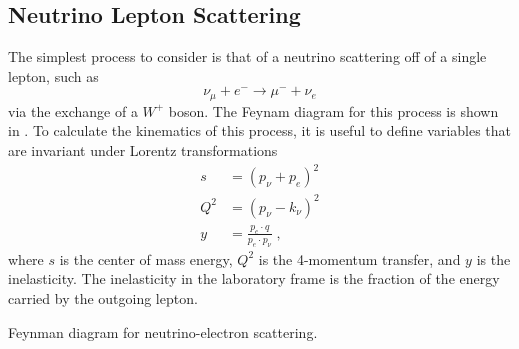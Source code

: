 \subsection{Neutrino Lepton Scattering}
The simplest process to consider is that of a neutrino scattering off of a single lepton, such as
\begin{equation}
    \nu_\mu + e^- \rightarrow \mu^- + \nu_e 
\end{equation}
via the exchange of a $W^+$ boson. The Feynam diagram for this process is shown in . 
To calculate the kinematics of this process, it is useful to define variables that are invariant under Lorentz transformations
\begin{equation}
\begin{aligned}
    s &= (p_\nu + p_e)^2 \\
    Q^2 &= (p_\nu - k_\nu)^2 \\
    y &= \frac{p_e \cdot q}{p_e \cdot p_\nu}\;,
\end{aligned}\label{eq:kinematic-quantities}
\end{equation}
where $s$ is the center of mass energy, $Q^2$ is the 4-momentum transfer, and $y$ is the inelasticity. The inelasticity in the laboratory frame is the fraction of the energy carried by the outgoing lepton.
\begin{marginfigure}
\caption{Feynman diagram for neutrino-electron scattering.\label{fig:feynman-nue-scatter}}
\end{marginfigure}
